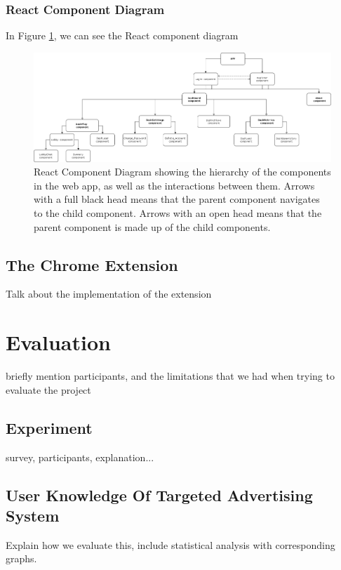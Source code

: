 \documentclass{l4proj}
\begin{document}
\subsection{React Component Diagram}
In Figure \ref{fig:react}, we can see the React component diagram
\begin{figure}
    \centering
    \includegraphics[width=1\linewidth]{images/react_comp_diagram.png}    

    \caption{React Component Diagram showing the hierarchy of the components in the web app, as well as the interactions between them. Arrows with a full black head means that the parent component navigates to the child component. Arrows with an open head means that the parent component is made up of the child components.}

    \label{fig:react} 
\end{figure}

\section{The Chrome Extension}
Talk about the implementation of the extension


\chapter{Evaluation} 
briefly mention participants, and the limitations that we had when trying to evaluate the project

\section{Experiment}
survey, participants, explanation...

\section{User Knowledge Of Targeted Advertising System}
Explain how we evaluate this, include statistical analysis with corresponding graphs.
\end{document}
